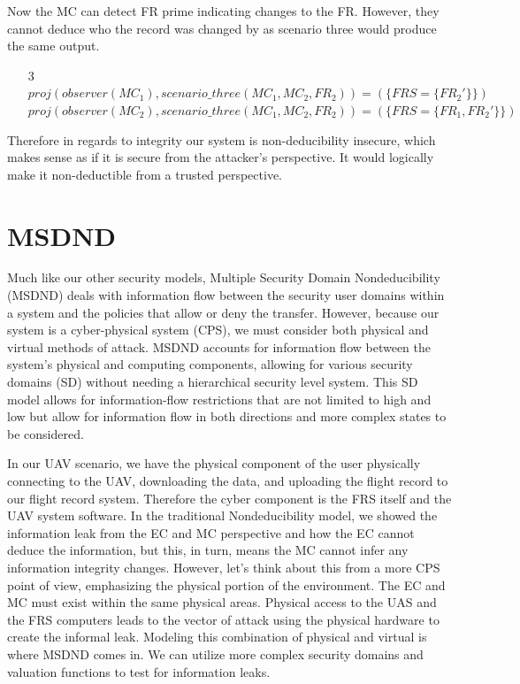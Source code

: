 \documentclass[10pt,journal,compsoc]{IEEEtran}
\begin{document}
Now the MC can detect FR prime indicating changes to the FR. However, they cannot deduce who the record was changed by as scenario three would produce the same output.

\begin{enumerate}
  \item[3] $proj(observer (MC_1),scenario\_three(MC_1, MC_2, FR_2)) = (\{FRS = \{FR_2'\}\})$ \\
  $proj(observer (MC_2),scenario\_three(MC_1, MC_2, FR_2)) = (\{FRS = \{FR_1, FR_2'\}\})$ \\
\end{enumerate}

Therefore in regards to integrity our system is non-deducibility insecure, which makes sense as if it is secure from the attacker's perspective. It would logically make it non-deductible from a trusted perspective.

\section{MSDND}

Much like our other security models, Multiple Security Domain Nondeducibility (MSDND) deals with information flow between the security user domains within a system and the policies that allow or deny the transfer. However, because our system is a cyber-physical system (CPS), we must consider both physical and virtual methods of attack. MSDND accounts for information flow between the system's physical and computing components, allowing for various security domains (SD) without needing a hierarchical security level system. This SD model allows for information-flow restrictions that are not limited to high and low but allow for information flow in both directions and more complex states to be considered. 

In our UAV scenario, we have the physical component of the user physically connecting to the UAV, downloading the data, and uploading the flight record to our flight record system. Therefore the cyber component is the FRS itself and the UAV system software. In the traditional Nondeducibility model, we showed the information leak from the EC and MC perspective and how the EC cannot deduce the information, but this, in turn, means the MC cannot infer any information integrity changes. However, let's think about this from a more CPS point of view, emphasizing the physical portion of the environment. The EC and MC must exist within the same physical areas. Physical access to the UAS and the FRS computers leads to the vector of attack using the physical hardware to create the informal leak. Modeling this combination of physical and virtual is where MSDND comes in. We can utilize more complex security domains and valuation functions to test for information leaks. 
\end{document}
